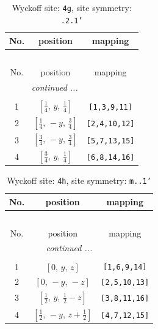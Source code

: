 \documentclass[fleqn,8pt]{jsarticle}
\begin{document}
\renewcommand{\arraystretch}{1.2}
\begin{longtable}{ccc}
\caption{Wyckoff site: {\tt 4g}, site symmetry: {\tt .2.1'}}
 \\
 \hline \hline
No. & position & mapping \\ \hline \endfirsthead

\multicolumn{2}{l}{\tablename\ \thetable{}} \\
 \hline \hline
No. & position & mapping \\ \hline \endhead

 \hline \hline
\multicolumn{2}{r}{\footnotesize\it continued ...} \\ \endfoot

 \hline \hline
\multicolumn{2}{r}{} \\ \endlastfoot

1 & $\left[ \frac{1}{4},\, y,\, \frac{1}{4} \right]$ & {\tt [1,3,9,11]} \\ \hline
2 & $\left[ \frac{1}{4},\, - y,\, \frac{3}{4} \right]$ & {\tt [2,4,10,12]} \\ \hline
3 & $\left[ \frac{3}{4},\, - y,\, \frac{3}{4} \right]$ & {\tt [5,7,13,15]} \\ \hline
4 & $\left[ \frac{3}{4},\, y,\, \frac{1}{4} \right]$ & {\tt [6,8,14,16]} \\
\end{longtable}
\renewcommand{\arraystretch}{1.2}
\begin{longtable}{ccc}
\caption{Wyckoff site: {\tt 4h}, site symmetry: {\tt m..1'}}
 \\
 \hline \hline
No. & position & mapping \\ \hline \endfirsthead

\multicolumn{2}{l}{\tablename\ \thetable{}} \\
 \hline \hline
No. & position & mapping \\ \hline \endhead

 \hline \hline
\multicolumn{2}{r}{\footnotesize\it continued ...} \\ \endfoot

 \hline \hline
\multicolumn{2}{r}{} \\ \endlastfoot

1 & $\left[ 0,\, y,\, z \right]$ & {\tt [1,6,9,14]} \\ \hline
2 & $\left[ 0,\, - y,\, - z \right]$ & {\tt [2,5,10,13]} \\ \hline
3 & $\left[ \frac{1}{2},\, y,\, \frac{1}{2} - z \right]$ & {\tt [3,8,11,16]} \\ \hline
4 & $\left[ \frac{1}{2},\, - y,\, z + \frac{1}{2} \right]$ & {\tt [4,7,12,15]} \\
\end{longtable}
\end{document}
